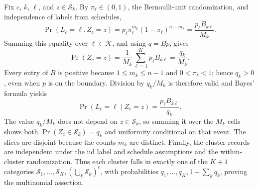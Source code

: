 Fix \(c\), \(k\), \(\ell\), and \(z\in\mathcal S_k\).  By \(\pi_\ell\in(0,1)\), the Bernoulli-unit randomization, and independence of labels from schedules,
\[
 \Pr(L_c=\ell,Z_c=z)
 =p_\ell\pi_\ell^{m_k}(1-\pi_\ell)^{n-m_k}
 =\frac{p_\ell B_{k\ell}}{M_k}.
\]
Summing this equality over \(\ell\in\mathcal K\), and using \(q=Bp\), gives
\[
 \Pr(Z_c=z)=\frac{1}{M_k}\sum_{\ell=1}^Kp_\ell B_{k\ell}=\frac{q_k}{M_k}.
\]
Every entry of \(B\) is positive because \(1\leq m_k\leq n-1\) and \(0<\pi_\ell<1\); hence \(q_k>0\), even when \(p\) is on the boundary.  Division by \(q_k/M_k\) is therefore valid and Bayes' formula yields
\[
 \Pr(L_c=\ell\mid Z_c=z)=\frac{p_\ell B_{k\ell}}{q_k}.
\]
The value \(q_k/M_k\) does not depend on \(z\in\mathcal S_k\), so summing it over the \(M_k\) cells shows both \(\Pr(Z_c\in\mathcal S_k)=q_k\) and uniformity conditional on that event.  The slices are disjoint because the counts \(m_k\) are distinct.  Finally, the cluster records are independent under the iid label and schedule assumptions and the within-cluster randomization.  Thus each cluster falls in exactly one of the \(K+1\) categories \(\mathcal S_1,\ldots,\mathcal S_K,(\bigcup_k\mathcal S_k)^c\), with probabilities \(q_1,\ldots,q_K,1-\sum_kq_k\), proving the multinomial assertion.